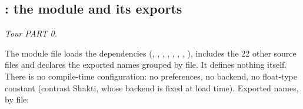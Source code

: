 \subsection{: the module and its exports}\label{ref:module}
\emph{Tour PART 0.}

The module file loads the dependencies (, , ,
, , , , ), includes the 22 other source files and
declares the exported names grouped by file. It defines nothing itself. There is no compile-time configuration: no
preferences, no backend, no float-type constant (contrast Shakti, whose backend is fixed at load time). Exported
names, by file:
